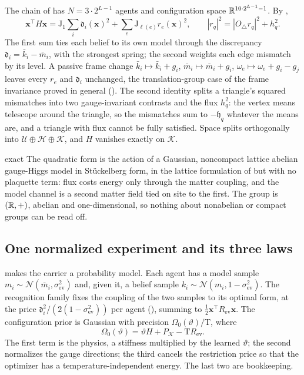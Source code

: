 The chain of  has \(N=3\cdot2^{L-1}\) agents and configuration space
\(\mathbb R^{10\cdot2^{L-1}-1}\). By ,
\[
\mathbf x^\top H\mathbf x=\mathrm J_1\sum_i\mathfrak d_i(\mathbf x)^2+\sum_e\mathrm J_{\ell(e)}r_e(\mathbf x)^2,
\qquad
|r_q|^2=|O_\triangle r_q|^2+h_q^2 .
\]
The first sum ties each belief to its own model through the discrepancy
\(\mathfrak d_i=\bar k_i-\bar m_i\), with the strongest spring; the second weights each edge mismatch by its
level. A passive frame change \(\bar k_i\mapsto\bar k_i+g_i\), \(\bar m_i\mapsto\bar m_i+g_i\),
\(\omega_e\mapsto\omega_e+g_i-g_j\) leaves every \(r_e\) and \(\mathfrak d_i\) unchanged, the
translation-group case of the frame invariance proved in general
(). The second identity splits a triangle's squared mismatches
into two gauge-invariant contrasts and the flux \(h_q^2\): the vertex means telescope around the triangle,
so the mismatches sum to \(-\mathfrak h_q\) whatever the means are, and a triangle with flux cannot be
fully satisfied. Space splits orthogonally into \(\mathcal U\oplus\mathcal H\oplus\mathcal K\), and \(H\)
vanishes exactly on \(\mathcal K\).

\begin{analogy}{exact}
The quadratic form is the action of a Gaussian, noncompact lattice abelian gauge-Higgs model in
St\"uckelberg form, in the lattice formulation of \citet{WilsonConfinement1974} but with no plaquette
term: flux costs energy only through the matter coupling, and the model channel is a second matter field
tied on site to the first. The group is \((\mathbb R,+)\), abelian and one-dimensional, so nothing about
nonabelian or compact groups can be read off.
\end{analogy}

\subsection{One normalized experiment and its three laws}
\label{comp:ch13-experiment}

 makes the carrier a probability model. Each agent has a model sample
\(m_i\sim\mathcal N(\bar m_i,\sigma^2_{\mathrm{ev}})\) and, given it, a belief sample
\(k_i\sim\mathcal N(m_i,1-\sigma^2_{\mathrm{ev}})\). The recognition family fixes the coupling of the two
samples to its optimal form, at the price \(\mathfrak d_i^2/(2(1-\sigma^2_{\mathrm{ev}}))\) per agent
(), summing to \(\tfrac12\mathbf x^\top R_{\mathrm{ev}}\mathbf x\).
The configuration prior is Gaussian with precision \(\Omega_0(\vartheta)/\mathrm T\), where
\[
\Omega_0(\vartheta)=\vartheta H+P_{\mathcal K}-\mathrm TR_{\mathrm{ev}} .
\]
The first term is the physics, a stiffness multiplied by the learned
\(\vartheta\); the second normalizes the gauge directions; the third cancels the restriction price so that
the optimizer has a temperature-independent energy. The last two are bookkeeping.

